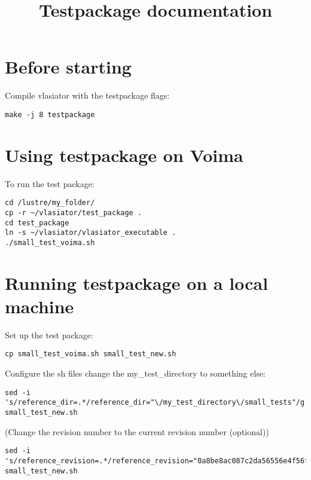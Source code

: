 \documentclass[a4paper,10pt]{article}
\title{Testpackage documentation}
\begin{document}
\maketitle

\tableofcontents

\newpage

\section{Before starting}

Compile vlasiator with the testpackage flags:

\begin{verbatim}
make -j 8 testpackage
\end{verbatim}

\section{Using testpackage on Voima} \label{sec:voima}

To run the test package:

\begin{verbatim}
cd /lustre/my_folder/
cp -r ~/vlasiator/test_package .
cd test_package
ln -s ~/vlasiator/vlasiator_executable .
./small_test_voima.sh
\end{verbatim}


\section{Running testpackage on a local machine}

Set up the test package:

\begin{verbatim}
cp small_test_voima.sh small_test_new.sh
\end{verbatim}

Configure the sh files change the my\_test\_directory to something else:

\begin{verbatim}
sed -i 's/reference_dir=.*/reference_dir="\/my_test_directory\/small_tests"/g' small_test_new.sh
\end{verbatim}

(Change the revision number to the current revision number (optional))

\begin{verbatim}
sed -i 's/reference_revision=.*/reference_revision="0a8be8ac087c2da56556e4f56fcb3e5826aa6f38"/g' small_test_new.sh
\end{verbatim}
\end{document}
